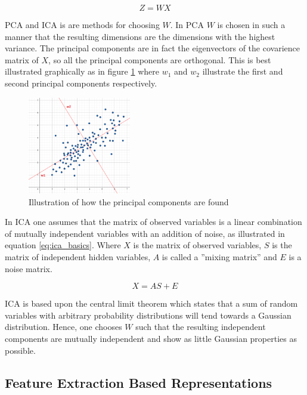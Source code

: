 \begin{equation}
    Z = W X
    \label{eq:reduce}
\end{equation}

PCA and ICA is are methods for choosing $W$. 
In PCA $W$ is chosen in such a manner that the resulting dimensions are the dimensions with the highest variance.
The principal components are in fact the eigenvectors of the covarience matrix of $X$, so all the principal components are orthogonal. 
This is best illustrated graphically as in figure \ref{fig:pca_illustrated} where $w_1$ and $w_2$ illustrate the first and second principal components respectively.

\begin{figure}
    \begin{center}
    \includegraphics[width=0.4\textwidth]{tsc/pca_illustrated.png}
    \end{center}
    \caption{Illustration of how the principal components are found} 
    \label{fig:pca_illustrated}
\end{figure}

In ICA one assumes that the matrix of observed variables is a linear combination of mutually independent variables with an addition of noise, as illustrated in equation \ref{eq:ica_basics}. 
Where $X$ is the matrix of observed variables, $S$ is the matrix of independent hidden variables, $A$ is called a ''mixing matrix'' and $E$ is a noise matrix.  

\begin{equation}
    X = A S + E
\end{equation}

ICA is based upon the central limit theorem which states that a sum of random variables with arbitrary probability distributions will tend towards a Gaussian distribution. 
Hence, one chooses $W$ such that the resulting independent components are mutually independent and show as little Gaussian properties as possible.

\subsection{Feature Extraction Based Representations}

